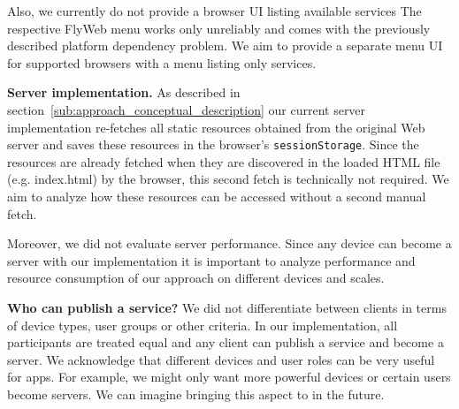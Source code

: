 Also, we currently do not provide a browser UI listing available \APIshort services The respective FlyWeb menu works only unreliably and comes with the previously described platform dependency problem. We aim to provide a separate menu UI for supported browsers with a menu listing only \APIshort services.

\textbf{Server implementation.}
As described in section~\ref{sub:approach_conceptual_description} our current server implementation re-fetches all static resources obtained from the original Web server and saves these resources in the browser's \texttt{sessionStorage}. Since the resources are already fetched when they are discovered in the loaded HTML file (e.g. index.html) by the browser, this second fetch is technically not required. We aim to analyze how these resources can be accessed without a second manual fetch.

Moreover, we did not evaluate server performance. Since any device can become a server with our implementation it is important to analyze performance and resource consumption of our approach on different devices and scales.

\textbf{Who can publish a service?}
We did not differentiate between clients in terms of device types, user groups or other criteria. In our implementation, all participants are treated equal and any client can publish a service and become a server. We acknowledge that different devices and user roles can be very useful for \APIshort apps. For example, we might only want more powerful devices or certain users become servers. We can imagine bringing this aspect to \APIName in the future.